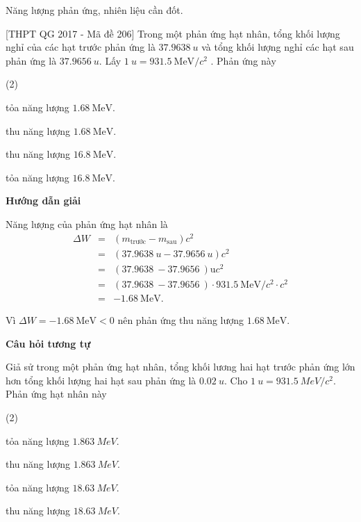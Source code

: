 \begin{dang}{Năng lượng phản ứng, nhiên liệu cần đốt.}
		{
		[THPT QG 2017 - Mã đề 206] Trong một phản ứng hạt nhân, tổng khối lượng nghỉ của các hạt trước phản ứng là $\SI{37,9638}{u}$ và tổng khối lượng nghỉ các hạt sau phản ứng là  $\SI{37,9656}{u}$. Lấy $\SI{1}{u}=\SI{931,5}{\mega\electronvolt/c^2}$ . Phản ứng này
		
		\begin{mcq}(2)
			\item tỏa năng lượng $\SI{1,68}{\mega\electronvolt}$.
			\item thu năng lượng $\SI{1,68}{\mega\electronvolt}$.
			\item thu năng lượng $\SI{16,8}{\mega\electronvolt}$.
			\item tỏa năng lượng $\SI{16,8}{\mega\electronvolt}$.
		\end{mcq}}
	{
		\begin{center}
			\textbf{Hướng dẫn giải}
		\end{center}
		
		Năng lượng của phản ứng hạt nhân là
			\begin{eqnarray*}
			\Delta W &=& \left(m_\text{trước} - m_\text{sau}\right) c^2 \\
			 	   	&=& \left(\SI{37,9638}{u} - \SI{37,9656}{u}\right) c^2\\
				  	&=&\left(\SI{37,9638}{} - \SI{37,9656}{}\right) \text{u}c^2\\
					 &=&\left(\SI{37,9638}{} - \SI{37,9656}{}\right) \cdot\SI{931,5}{\mega\electronvolt/c^2}\cdot c^2\\
					&=&-\SI{1,68}{\mega\electronvolt}.
			\end{eqnarray*}
		
		Vì $\Delta W = -\SI{1,68}{\mega\electronvolt} < 0$ nên phản ứng thu năng lượng $\SI{1,68}{\mega\electronvolt}$.
		
		\begin{center}
			\textbf{Câu hỏi tương tự}
		\end{center}
		
Giả sử trong một phản ứng hạt nhân, tổng khối lương hai hạt trước phản ứng lớn hơn tổng khối lượng hai hạt sau phản ứng là $\SI{0.02}{u}$. Cho $\SI{1}{u} = \SI{931.5}{MeV/c^2}$. Phản ứng hạt nhân này
	\begin{mcq}(2)
		\item tỏa năng lượng $\SI{1.863}{MeV}$.
		\item thu năng lượng $\SI{1.863}{MeV}$.
		\item tỏa năng lượng $\SI{18.63}{MeV}$.
		\item thu năng lượng $\SI{18.63}{MeV}$.
	\end{mcq}
		
}
\end{dang}
